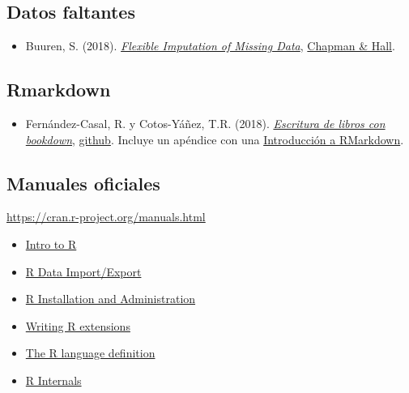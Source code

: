 \documentclass[
]{book}
\providecommand{\tightlist}{%
  \setlength{\itemsep}{0pt}\setlength{\parskip}{0pt}}
\theoremstyle{break}
\theoremstyle{nonumberplain}
\begin{document}
\hypertarget{datos-faltantes}{%
\subsection*{Datos faltantes}\label{datos-faltantes}}

\begin{itemize}
\tightlist
\item
  Buuren, S. (2018). \emph{\href{https://stefvanbuuren.name/fimd}{Flexible Imputation of Missing Data}}, \href{}{Chapman \& Hall}.
\end{itemize}

\hypertarget{rmarkdown}{%
\subsection*{Rmarkdown}\label{rmarkdown}}

\begin{itemize}
\tightlist
\item
  Fernández-Casal, R. y Cotos-Yáñez, T.R. (2018). \emph{\href{https://rubenfcasal.github.io/bookdown_intro}{Escritura de libros con bookdown}}, \href{https://github.com/rubenfcasal/bookdown_intro}{github}. Incluye un apéndice con una \href{https://rubenfcasal.github.io/bookdown_intro/rmarkdown.html}{Introducción a RMarkdown}.
\end{itemize}

\hypertarget{manuales-oficiales}{%
\subsection*{Manuales oficiales}\label{manuales-oficiales}}

\url{https://cran.r-project.org/manuals.html}

\begin{itemize}
\item
  \href{http://colinfay.me/intro-to-r/}{Intro to R}
\item
  \href{http://colinfay.me/r-data-import-export/}{R Data Import/Export}
\item
  \href{http://colinfay.me/r-installation-administration/}{R Installation and Administration}
\item
  \href{http://colinfay.me/writing-r-extensions/}{Writing R extensions}
\item
  \href{http://colinfay.me/r-language-definition/}{The R language definition}
\item
  \href{http://colinfay.me/r-internals/}{R Internals}
\end{itemize}
\end{document}
